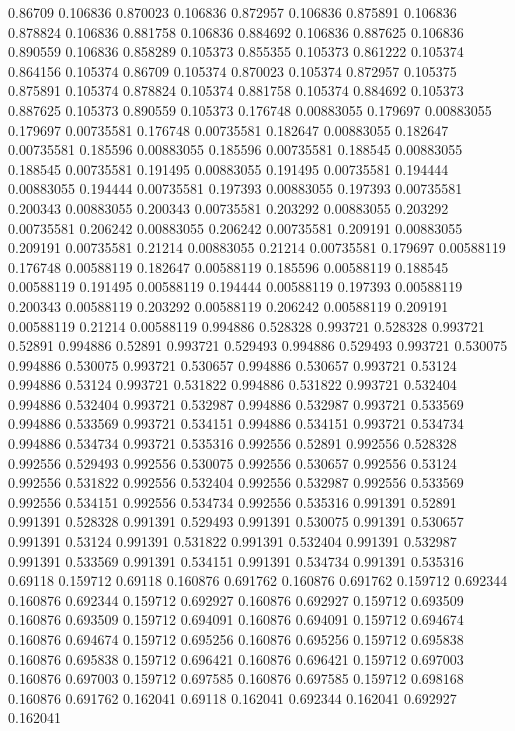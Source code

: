 0.86709 0.106836
0.870023 0.106836
0.872957 0.106836
0.875891 0.106836
0.878824 0.106836
0.881758 0.106836
0.884692 0.106836
0.887625 0.106836
0.890559 0.106836
0.858289 0.105373
0.855355 0.105373
0.861222 0.105374
0.864156 0.105374
0.86709 0.105374
0.870023 0.105374
0.872957 0.105375
0.875891 0.105374
0.878824 0.105374
0.881758 0.105374
0.884692 0.105373
0.887625 0.105373
0.890559 0.105373
0.176748 0.00883055
0.179697 0.00883055
0.179697 0.00735581
0.176748 0.00735581
0.182647 0.00883055
0.182647 0.00735581
0.185596 0.00883055
0.185596 0.00735581
0.188545 0.00883055
0.188545 0.00735581
0.191495 0.00883055
0.191495 0.00735581
0.194444 0.00883055
0.194444 0.00735581
0.197393 0.00883055
0.197393 0.00735581
0.200343 0.00883055
0.200343 0.00735581
0.203292 0.00883055
0.203292 0.00735581
0.206242 0.00883055
0.206242 0.00735581
0.209191 0.00883055
0.209191 0.00735581
0.21214 0.00883055
0.21214 0.00735581
0.179697 0.00588119
0.176748 0.00588119
0.182647 0.00588119
0.185596 0.00588119
0.188545 0.00588119
0.191495 0.00588119
0.194444 0.00588119
0.197393 0.00588119
0.200343 0.00588119
0.203292 0.00588119
0.206242 0.00588119
0.209191 0.00588119
0.21214 0.00588119
0.994886 0.528328
0.993721 0.528328
0.993721 0.52891
0.994886 0.52891
0.993721 0.529493
0.994886 0.529493
0.993721 0.530075
0.994886 0.530075
0.993721 0.530657
0.994886 0.530657
0.993721 0.53124
0.994886 0.53124
0.993721 0.531822
0.994886 0.531822
0.993721 0.532404
0.994886 0.532404
0.993721 0.532987
0.994886 0.532987
0.993721 0.533569
0.994886 0.533569
0.993721 0.534151
0.994886 0.534151
0.993721 0.534734
0.994886 0.534734
0.993721 0.535316
0.992556 0.52891
0.992556 0.528328
0.992556 0.529493
0.992556 0.530075
0.992556 0.530657
0.992556 0.53124
0.992556 0.531822
0.992556 0.532404
0.992556 0.532987
0.992556 0.533569
0.992556 0.534151
0.992556 0.534734
0.992556 0.535316
0.991391 0.52891
0.991391 0.528328
0.991391 0.529493
0.991391 0.530075
0.991391 0.530657
0.991391 0.53124
0.991391 0.531822
0.991391 0.532404
0.991391 0.532987
0.991391 0.533569
0.991391 0.534151
0.991391 0.534734
0.991391 0.535316
0.69118 0.159712
0.69118 0.160876
0.691762 0.160876
0.691762 0.159712
0.692344 0.160876
0.692344 0.159712
0.692927 0.160876
0.692927 0.159712
0.693509 0.160876
0.693509 0.159712
0.694091 0.160876
0.694091 0.159712
0.694674 0.160876
0.694674 0.159712
0.695256 0.160876
0.695256 0.159712
0.695838 0.160876
0.695838 0.159712
0.696421 0.160876
0.696421 0.159712
0.697003 0.160876
0.697003 0.159712
0.697585 0.160876
0.697585 0.159712
0.698168 0.160876
0.691762 0.162041
0.69118 0.162041
0.692344 0.162041
0.692927 0.162041
